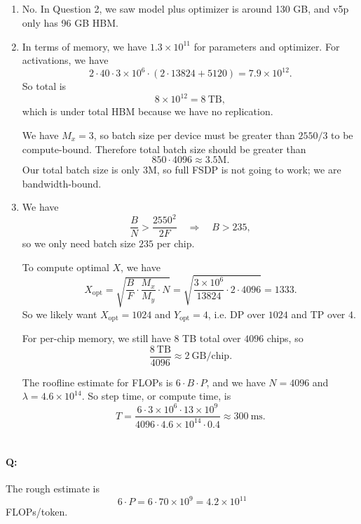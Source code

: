 \documentclass[11pt]{article}
\newcommand{\B}{B}
\newcommand{\F}{F}
\newcommand{\quizbreak}{\Needspace{6\baselineskip}}
\begin{document}
\subsection{}
\begin{enumerate}
  \item No. In Question 2, we saw model plus optimizer is around 130 GB, and v5p only has 96 GB HBM.

  \item In terms of memory, we have $1.3\times 10^{11}$ for parameters and optimizer. For activations, we have
  \[
    2\cdot 40\cdot 3\times 10^6\cdot (2\cdot 13824+5120)
    =
    7.9\times 10^{12}.
  \]
  So total is
  \[
    8\times 10^{12}=8\ \mathrm{TB},
  \]
  which is under total HBM because we have no replication.

  We have $M_x=3$, so batch size per device must be greater than $2550/3$ to be compute-bound. Therefore total batch size should be greater than
  \[
    850\cdot 4096 \approx 3.5\mathrm{M}.
  \]
  Our total batch size is only $3\mathrm{M}$, so full FSDP is not going to work; we are bandwidth-bound.

  \item We have
  \[
    \frac{\B}{N}>\frac{2550^2}{2\F}
    \quad\Longrightarrow\quad
    \B>235,
  \]
  so we only need batch size $235$ per chip.

  To compute optimal $X$, we have
  \[
    X_{\mathrm{opt}}
    =
    \sqrt{\frac{\B}{\F}\cdot \frac{M_x}{M_y}\cdot N}
    =
    \sqrt{\frac{3\times 10^6}{13824}\cdot 2\cdot 4096}
    =
    1333.
  \]
  So we likely want $X_{\mathrm{opt}}=1024$ and $Y_{\mathrm{opt}}=4$, i.e. DP over $1024$ and TP over $4$.

  For per-chip memory, we still have $8$ TB total over $4096$ chips, so
  \[
    \frac{8\ \mathrm{TB}}{4096}\approx 2\ \mathrm{GB/chip}.
  \]

  The roofline estimate for FLOPs is $6\cdot B\cdot P$, and we have $N=4096$ and $\lambda=4.6\times 10^{14}$. So step time, or compute time, is
  \[
    T=
    \frac{6\cdot 3\times 10^6\cdot 13\times 10^9}
         {4096\cdot 4.6\times 10^{14}\cdot 0.4}
    \approx 300\ \mathrm{ms}.
  \]
\end{enumerate}

\clearpage
\section{}

\quizbreak
\paragraph{Q:}
The rough estimate is
\[
  6\cdot P = 6\cdot 70\times 10^9 = 4.2\times 10^{11}
\]
FLOPs/token.
\end{document}
